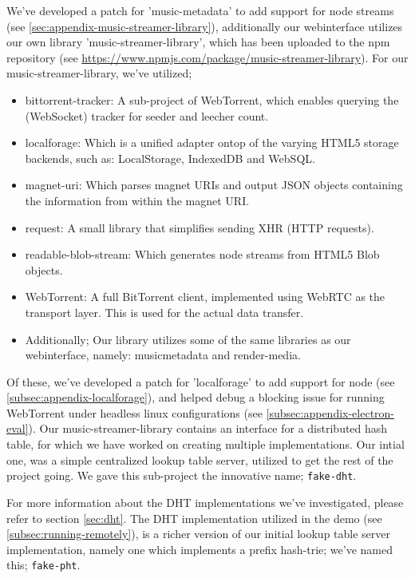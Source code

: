 We've developed a patch for 'music-metadata' to add support for node streams
(see \ref{sec:appendix-music-streamer-library}), additionally our webinterface
utilizes our own library 'music-streamer-library', which has been uploaded to
the npm repository (see \url{https://www.npmjs.com/package/music-streamer-library}).
\newline\newline
For our music-streamer-library, we've utilized;
\begin{itemize}
\item bittorrent-tracker: A sub-project of WebTorrent, which enables querying 
        the (WebSocket) tracker for seeder and leecher count.
\item localforage: Which is a unified adapter ontop of the varying HTML5
        storage backends, such as: LocalStorage, IndexedDB and WebSQL.
\item magnet-uri: Which parses magnet URIs and output JSON objects containing
        the information from within the magnet URI.
\item request: A small library that simplifies sending XHR (HTTP requests).
\item readable-blob-stream: Which generates node streams from HTML5 Blob objects.
\item WebTorrent: A full BitTorrent client, implemented using WebRTC as the 
        transport layer. This is used for the actual data transfer.
\item Additionally; Our library utilizes some of the same libraries as our
        webinterface, namely: musicmetadata and render-media.
\end{itemize}
Of these, we've developed a patch for 'localforage' to add support for node
(see \ref{subsec:appendix-localforage}), and helped debug a blocking issue for
running WebTorrent under headless linux configurations (see
\ref{subsec:appendix-electron-eval}).
\newline\newline
Our music-streamer-library contains an interface for a distributed hash table,
for which we have worked on creating multiple implementations. Our intial one,
was a simple centralized lookup table server, utilized to get the rest of the 
project going. We gave this sub-project the innovative name; \verb|fake-dht|.

For more information about the DHT implementations we've investigated, please
refer to section \ref{sec:dht}.
\newline\newline
The DHT implementation utilized in the demo (see \ref{subsec:running-remotely}),
is a richer version of our initial lookup table server implementation, namely
one which implements a prefix hash-trie; we've named this; \verb|fake-pht|.

